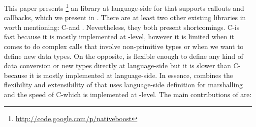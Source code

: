 


This paper presents \NBFFI\footnote{\url{http://code.google.com/p/nativeboost}} an \FFI library at language-side for \PH that supports callouts and callbacks, which we present in .
There are at least two other existing \FFI libraries in \PH worth mentioning: C-\FFI and \Alien.
Nevertheless, they both present shortcomings.
C-\FFI is fast because it is mostly implemented at \VM-level, however it is limited when it comes to do complex calls that involve non-primitive types or when we want to define new data types.
On the opposite, \Alien \FFI is flexible enough to define any kind of data conversion or new types directly at language-side but it is slower than C-\FFI because it is mostly implemented at language-side.
In essence, \NBFFI combines the flexibility and extensibility of \Alien that uses language-side definition for marshalling and the speed of C-\FFI which is implemented at \VM-level.
The main contributions of \NBFFI are:

